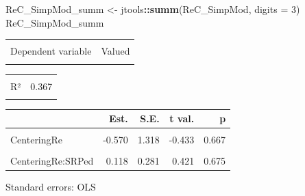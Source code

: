 \documentclass[
  11pt,
]{book}
\newenvironment{Shaded}{\begin{snugshade}}{\end{snugshade}}
\newcommand{\AttributeTok}[1]{\textcolor[rgb]{0.27,0.27,0.27}{#1}}
\newcommand{\DecValTok}[1]{\textcolor[rgb]{0.06,0.06,0.06}{#1}}
\newcommand{\FunctionTok}[1]{\textcolor[rgb]{0.27,0.27,0.27}{\textbf{#1}}}
\newcommand{\NormalTok}[1]{#1}
\newcommand{\OtherTok}[1]{\textcolor[rgb]{0.37,0.37,0.37}{#1}}
\newcommand{\SpecialCharTok}[1]{\textcolor[rgb]{0.43,0.43,0.43}{\textbf{#1}}}
\begin{document}
\begin{Shaded}
\begin{Highlighting}[]
\NormalTok{ReC\_SimpMod\_summ }\OtherTok{\textless{}{-}}\NormalTok{ jtools}\SpecialCharTok{::}\FunctionTok{summ}\NormalTok{(ReC\_SimpMod, }\AttributeTok{digits =} \DecValTok{3}\NormalTok{)}
\NormalTok{ReC\_SimpMod\_summ}
\end{Highlighting}
\end{Shaded}

\begin{table}[!h]
\centering
\begin{tabular}{lr}
\toprule
\cellcolor{gray!6}{Observations} & \cellcolor{gray!6}{81 (3 missing obs. deleted)}\\
Dependent variable & Valued\\
\cellcolor{gray!6}{Type} & \cellcolor{gray!6}{OLS linear regression}\\
\bottomrule
\end{tabular}
\end{table} \begin{table}[!h]
\centering
\begin{tabular}{lr}
\toprule
\cellcolor{gray!6}{F(3,77)} & \cellcolor{gray!6}{14.904}\\
R² & 0.367\\
\cellcolor{gray!6}{Adj. R²} & \cellcolor{gray!6}{0.343}\\
\bottomrule
\end{tabular}
\end{table} \begin{table}[!h]
\centering
\begin{threeparttable}
\begin{tabular}{lrrrr}
\toprule
  & Est. & S.E. & t val. & p\\
\midrule
\cellcolor{gray!6}{(Intercept)} & \cellcolor{gray!6}{1.057} & \cellcolor{gray!6}{0.563} & \cellcolor{gray!6}{1.876} & \cellcolor{gray!6}{0.064}\\
CenteringRe & -0.570 & 1.318 & -0.433 & 0.667\\
\cellcolor{gray!6}{SRPed} & \cellcolor{gray!6}{0.704} & \cellcolor{gray!6}{0.127} & \cellcolor{gray!6}{5.530} & \cellcolor{gray!6}{0.000}\\
CenteringRe:SRPed & 0.118 & 0.281 & 0.421 & 0.675\\
\bottomrule
\end{tabular}
\begin{tablenotes}
\item Standard errors: OLS
\end{tablenotes}
\end{threeparttable}
\end{table}
\end{document}
